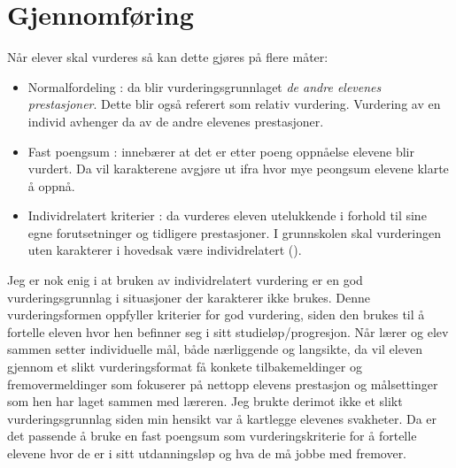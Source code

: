 \documentclass[main.tex]{subfiles}
\begin{document}
\section*{Gjennomføring}
\label{sec:3}
Når elever skal vurderes så kan dette gjøres på flere måter:
\begin{itemize}
\item Normalfordeling : da blir vurderingsgrunnlaget \emph{de andre elevenes prestasjoner}. 
Dette blir også referert som relativ vurdering. Vurdering av en individ avhenger da av de andre
elevenes prestasjoner.
\item Fast poengsum : innebærer at det er etter poeng oppnåelse elevene blir vurdert. Da vil
karakterene avgjøre ut ifra hvor mye peongsum elevene klarte å oppnå.
\item Individrelatert kriterier : da vurderes eleven utelukkende i forhold til sine egne forutsetninger
og tidligere prestasjoner. I grunnskolen skal vurderingen uten karakterer i hovedsak være 
individrelatert ().
\end{itemize}
Jeg er nok enig i at bruken av individrelatert vurdering er en god vurderingsgrunnlag i situasjoner
der karakterer ikke brukes. Denne vurderingsformen oppfyller kriterier for god vurdering,
siden den brukes til å fortelle eleven hvor hen befinner seg i sitt studieløp/progresjon.
Når lærer og elev sammen setter individuelle mål, både nærliggende og langsikte, da vil eleven
gjennom et slikt vurderingsformat få konkete tilbakemeldinger og fremovermeldinger som 
fokuserer på nettopp elevens prestasjon og målsettinger som hen har laget sammen med
læreren.
\newline
\newline
Jeg brukte derimot ikke et slikt vurderingsgrunnlag siden min hensikt var å kartlegge elevenes
svakheter. Da er det passende å bruke en fast poengsum som vurderingskriterie for å 
fortelle elevene hvor de er i sitt utdanningsløp og hva de må jobbe med fremover. 
\end{document}

